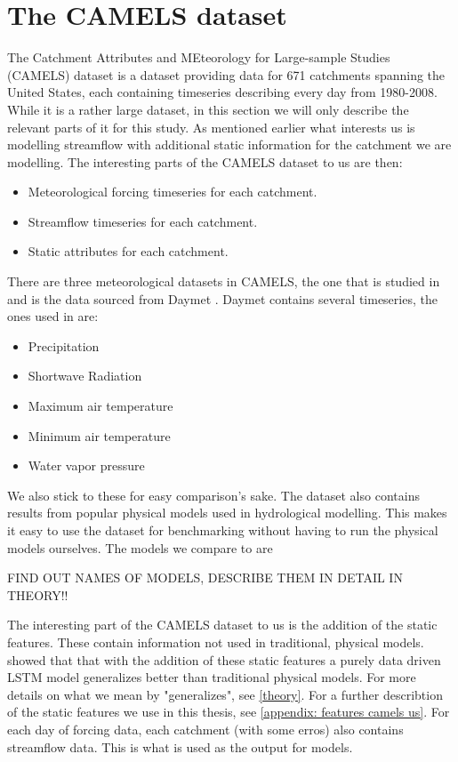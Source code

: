 \section{The CAMELS dataset}
The Catchment Attributes and MEteorology for Large-sample Studies (CAMELS) dataset \citep{CAMELS_US}
is a dataset providing data for 671 catchments spanning the United States, each
containing timeseries describing every day from 1980-2008. While 
it is a rather large dataset, 
in this section we will only describe the relevant parts of it for this study. 
As mentioned earlier what interests us is modelling streamflow with additional 
static information for the catchment we are modelling. The interesting parts of
the CAMELS dataset to us are then:
\begin{itemize}
    \item Meteorological forcing timeseries for each catchment.
    \item Streamflow timeseries for each catchment.
    \item Static attributes for each catchment.
\end{itemize}
There are three meteorological datasets in CAMELS, the one that is studied in \citet{CAMELS_US}
and \citet{lstm_first_paper,lstm_second_paper,lstm_third_paper} is the data sourced from Daymet \citep{thornton2012daymet}.
Daymet contains several timeseries, the ones used in \citet{lstm_second_paper} are:
\begin{itemize}
    \item Precipitation
    \item Shortwave Radiation
    \item Maximum air temperature
    \item Minimum air temperature
    \item Water vapor pressure
\end{itemize}
We also stick to these for easy comparison's sake.
The dataset also contains results from popular physical models used in hydrological 
modelling. This makes it easy to use the dataset for benchmarking without having 
to run the physical models ourselves. The models we compare to are \begin{Large}
FIND OUT NAMES OF MODELS, DESCRIBE THEM IN DETAIL IN THEORY!!
\end{Large}
The interesting part of the CAMELS dataset to us is the addition of the static 
features. These contain information not used in traditional, physical models. 
\citet{lstm_second_paper,lstm_third_paper} showed that that
with the addition of these static features a purely data driven LSTM model generalizes
better than traditional physical models. For more details on what we mean by 
"generalizes", see \ref{theory}. For a further describtion of the static features
we use in this thesis, see \ref{appendix: features camels us}.
For each day of forcing data, each catchment (with some erros) also contains 
streamflow data. This is what is used as the output for models.

